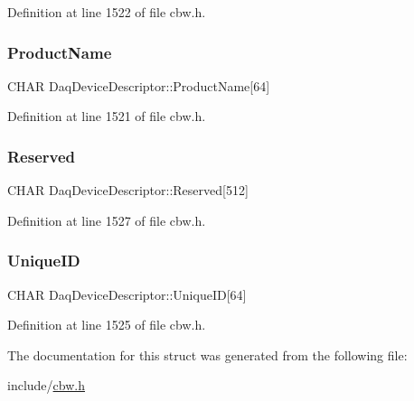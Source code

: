 Definition at line 1522 of file cbw.\+h.

\mbox{\label{struct_daq_device_descriptor_a7af4f8a2ea731e6cbb069ce2e1c87fec}} 
\subsubsection{\texorpdfstring{Product\+Name}{ProductName}}
{\footnotesize\ttfamily C\+H\+AR Daq\+Device\+Descriptor\+::\+Product\+Name\mbox{[}64\mbox{]}}



Definition at line 1521 of file cbw.\+h.

\mbox{\label{struct_daq_device_descriptor_a53cec846e1dc3556f4fdceadce9c30d8}} 
\subsubsection{\texorpdfstring{Reserved}{Reserved}}
{\footnotesize\ttfamily C\+H\+AR Daq\+Device\+Descriptor\+::\+Reserved\mbox{[}512\mbox{]}}



Definition at line 1527 of file cbw.\+h.

\mbox{\label{struct_daq_device_descriptor_a9e3f88648eb606baa0922fa0526abe24}} 
\subsubsection{\texorpdfstring{Unique\+ID}{UniqueID}}
{\footnotesize\ttfamily C\+H\+AR Daq\+Device\+Descriptor\+::\+Unique\+ID\mbox{[}64\mbox{]}}



Definition at line 1525 of file cbw.\+h.



The documentation for this struct was generated from the following file\+:\begin{DoxyCompactItemize}
\item 
include/\hyperlink{cbw_8h}{cbw.\+h}\end{DoxyCompactItemize}
